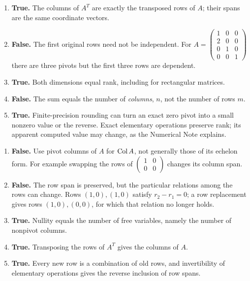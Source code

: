\begin{enumerate}[label=(\alph*)]
\item \textbf{True.} The columns of $A^T$ are exactly the transposed rows
of $A$; their spans are the same coordinate vectors.
\item \textbf{False.} The first original rows need not be independent.
For $A=\left(\begin{smallmatrix}1&0&0\\2&0&0\\0&1&0\\0&0&1\end{smallmatrix}\right)$
there are three pivots but the first three rows are dependent.
\item \textbf{True.} Both dimensions equal rank, including for rectangular matrices.
\item \textbf{False.} The sum equals the number of \emph{columns}, $n$,
not the number of rows $m$.
\item \textbf{True.} Finite-precision rounding can turn an exact zero
pivot into a small nonzero value or the reverse. Exact elementary operations
preserve rank; its apparent computed value may change, as the Numerical Note explains.
\end{enumerate}

\begin{enumerate}[label=(\alph*)]
\item \textbf{False.} Use pivot columns of $A$ for $\operatorname{Col} A$, not generally
those of its echelon form. For example swapping the rows of
$\left(\begin{smallmatrix}1&0\\0&0\end{smallmatrix}\right)$ changes its column span.
\item \textbf{False.} The row span is preserved, but the particular
relations among the rows can change. Rows $(1,0),(1,0)$ satisfy $r_2-r_1=0$;
a row replacement gives rows $(1,0),(0,0)$, for which that relation no longer holds.
\item \textbf{True.} Nullity equals the number of free variables,
namely the number of nonpivot columns.
\item \textbf{True.} Transposing the rows of $A^T$ gives the columns of $A$.
\item \textbf{True.} Every new row is a combination of old rows, and
invertibility of elementary operations gives the reverse inclusion of row spans.
\end{enumerate}

